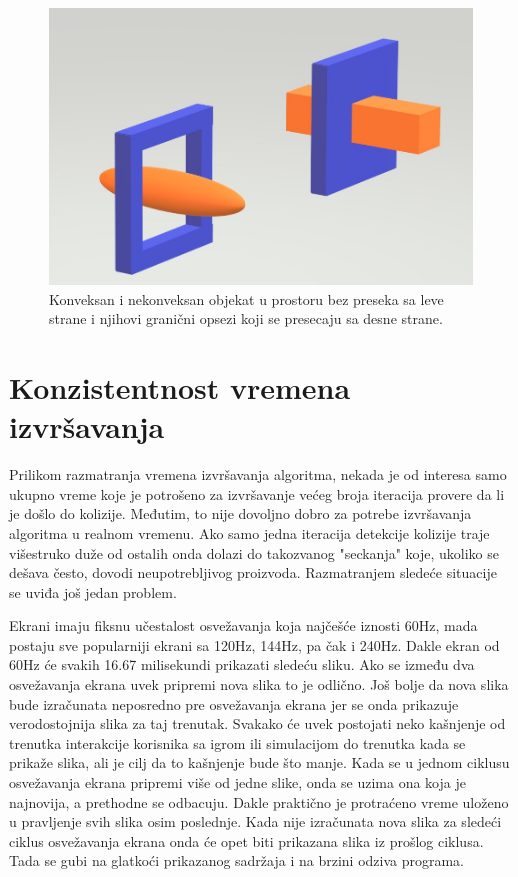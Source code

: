 \documentclass[12pt,oneside]{memoir}
\begin{document}
\begin{figure}[h!]
	\begin{center}
	\includegraphics[scale=0.5]{falseCollision.jpg}
	\end{center}
	
	\caption{Konveksan i nekonveksan objekat u prostoru bez preseka sa leve strane i
	njihovi granični opsezi koji se presecaju sa desne strane. }
	\label{fig:falseCollision}
\end{figure}


\section{Konzistentnost vremena izvršavanja}

Prilikom razmatranja vremena izvršavanja algoritma, nekada je od interesa 
samo ukupno vreme koje je potrošeno za izvršavanje većeg broja iteracija provere da li je došlo do kolizije. 
Međutim, to nije dovoljno dobro za potrebe izvršavanja algoritma u realnom vremenu.
Ako samo jedna iteracija 
detekcije kolizije traje višestruko duže od ostalih onda dolazi do takozvanog "seckanja"
koje, ukoliko se dešava često, dovodi neupotrebljivog proizvoda.
Razmatranjem sledeće situacije se uviđa još jedan problem.

Ekrani imaju fiksnu učestalost osvežavanja koja najčešće iznosti 60Hz, mada postaju sve popularniji
ekrani sa 120Hz, 144Hz, pa čak i 240Hz. Dakle ekran od 60Hz će svakih 16.67 milisekundi prikazati sledeću sliku. 
Ako se između dva osvežavanja ekrana uvek pripremi nova slika to je odlično. 
Još bolje da nova slika bude izračunata neposredno pre osvežavanja ekrana jer se onda 
prikazuje verodostojnija slika za taj trenutak. 
Svakako će uvek postojati neko kašnjenje od trenutka interakcije korisnika sa igrom ili simulacijom do
trenutka kada se prikaže slika, ali je cilj da to kašnjenje bude što manje. 
Kada se u jednom ciklusu osvežavanja ekrana pripremi više od jedne slike, onda se uzima ona koja je najnovija,
a prethodne se odbacuju. 
Dakle praktično je protraćeno vreme uloženo u pravljenje svih slika osim poslednje.
Kada nije izračunata nova slika za sledeći ciklus osvežavanja ekrana onda će opet biti prikazana slika
iz prošlog ciklusa. Tada se gubi na glatkoći prikazanog sadržaja i na brzini odziva programa. 
\end{document}
